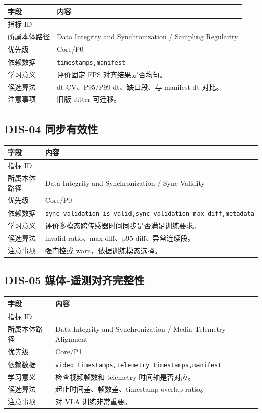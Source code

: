 \documentclass[UTF8,zihao=-4,oneside,openany]{ctexrep}
\newcommand{\Code}[1]{\texttt{#1}}
\newcommand{\MID}[1]{\texttt{\seqsplit{#1}}}
\begin{document}
\begin{longtable}{L{3.6cm} L{9.6cm}}
\toprule
字段 & 内容 \\
\midrule
指标 ID & \MID{DIS-03} \\
所属本体路径 & Data Integrity and Synchronization / Sampling Regularity \\
优先级 & Core/P0 \\
依赖数据 & \Code{timestamps,manifest} \\
学习意义 & 评价固定 FPS 对齐结果是否均匀。 \\
候选算法 & dt CV、P95/P99 dt、缺口段、与 manifest dt 对比。 \\
注意事项 & 旧版 Jitter 可迁移。 \\
\bottomrule
\end{longtable}

\subsection{DIS-04 同步有效性}

\begin{longtable}{L{3.6cm} L{9.6cm}}
\toprule
字段 & 内容 \\
\midrule
指标 ID & \MID{DIS-04} \\
所属本体路径 & Data Integrity and Synchronization / Sync Validity \\
优先级 & Core/P0 \\
依赖数据 & \Code{sync\_validation\_is\_valid,sync\_validation\_max\_diff,metadata} \\
学习意义 & 评价多模态跨传感器时间同步是否满足训练要求。 \\
候选算法 & invalid ratio、max diff、p95 diff、异常连续段。 \\
注意事项 & 强门控或 warn，依据训练模态选择。 \\
\bottomrule
\end{longtable}

\subsection{DIS-05 媒体-遥测对齐完整性}

\begin{longtable}{L{3.6cm} L{9.6cm}}
\toprule
字段 & 内容 \\
\midrule
指标 ID & \MID{DIS-05} \\
所属本体路径 & Data Integrity and Synchronization / Media-Telemetry Alignment \\
优先级 & Core/P1 \\
依赖数据 & \Code{video timestamps,telemetry timestamps,manifest} \\
学习意义 & 检查视频帧数和 telemetry 时间轴是否对应。 \\
候选算法 & 起止时间差、帧数差、timestamp overlap ratio。 \\
注意事项 & 对 VLA 训练非常重要。 \\
\bottomrule
\end{longtable}
\end{document}
